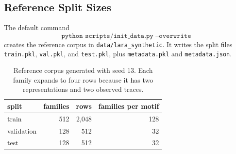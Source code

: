 \documentclass[11pt]{article}
\begin{document}
\FloatBarrier

\subsection{Reference Split Sizes}

The default command
\[
  \texttt{python scripts/init\_data.py --overwrite}
\]
creates the reference corpus in \texttt{data/lara\_synthetic}. It writes the split files \texttt{train.pkl}, \texttt{val.pkl}, and
\texttt{test.pkl}, plus \texttt{metadata.pkl} and \texttt{metadata.json}.

\begin{table}
\centering
\caption{Reference corpus generated with seed 13. Each family expands to four
rows because it has two representations and two observed traces.}
\label{tab:appendix-splits}
\small
\begin{tabular}{@{}lrrr@{}}
\toprule
split & families & rows & families per motif \\
\midrule
train & 512 & 2{,}048 & 128 \\
validation & 128 & 512 & 32 \\
test & 128 & 512 & 32 \\
\bottomrule
\end{tabular}
\end{table}
\end{document}
